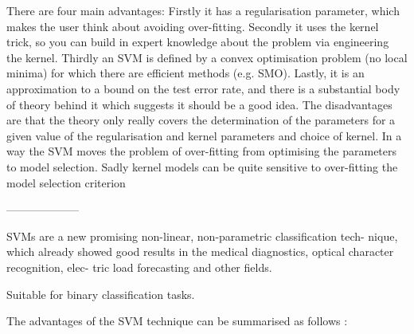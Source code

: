 There are four main advantages: Firstly it has a regularisation parameter, which makes the user think about avoiding over-fitting. Secondly it uses the kernel trick, so you can build in expert knowledge about the problem via engineering the kernel. Thirdly an SVM is defined by a convex optimisation problem (no local minima) for which there are efficient methods (e.g. SMO). Lastly, it is an approximation to a bound on the test error rate, and there is a substantial body of theory behind it which suggests it should be a good idea.
The disadvantages are that the theory only really covers the determination of the parameters for a given value of the regularisation and kernel parameters and choice of kernel. In a way the SVM moves the problem of over-fitting from optimising the parameters to model selection. Sadly kernel models can be quite sensitive to over-fitting the model selection criterion \cite{cawley2010over}

--------------------

SVMs are a new promising non-linear, non-parametric classification tech- nique, which already showed good results in the medical diagnostics, optical character recognition, elec- tric load forecasting and other fields.

Suitable for binary classification tasks.

The advantages of the SVM technique can be summarised as follows \cite{auria2008support}:

